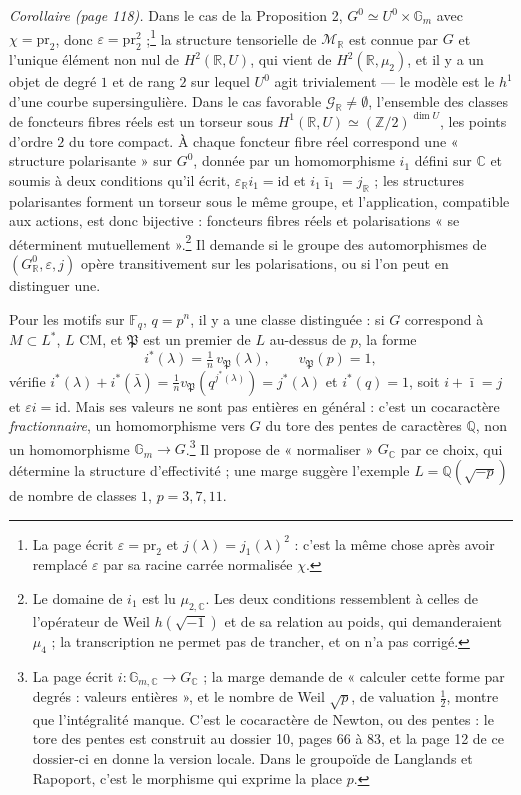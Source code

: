 \documentclass[11pt,a4paper]{article}
\begin{document}
\emph{Corollaire (page 118).} Dans le cas de la Proposition 2, $G^{0} \simeq
U^{0} \times \mathbb{G}_{m}$ avec $\chi = \mathrm{pr}_{2}$, donc $\varepsilon =
\mathrm{pr}_{2}^{2}$ ;\footnote{La page écrit $\varepsilon = \mathrm{pr}_{2}$ et
$j(\lambda) = j_{1}(\lambda)^{2}$ : c'est la même chose après avoir remplacé
$\varepsilon$ par sa racine carrée normalisée $\chi$.} la structure tensorielle de
$\mathcal{M}_{\mathbb{R}}$ est connue par $G$ et l'unique élément non nul de
$H^{2}(\mathbb{R}, U)$, qui vient de $H^{2}(\mathbb{R}, \mu_{2})$, et il y a un
objet de degré $1$ et de rang $2$ sur lequel $U^{0}$ agit trivialement --- le
modèle est le $h^{1}$ d'une courbe supersingulière. Dans le cas favorable
$\mathcal{G}_{\mathbb{R}} \neq \emptyset$, l'ensemble des classes de foncteurs
fibres réels est un torseur sous $H^{1}(\mathbb{R}, U) \simeq
(\mathbb{Z}/2)^{\dim U}$, les points d'ordre $2$ du tore compact. À chaque
foncteur fibre réel correspond une « structure polarisante » sur $G^{0}$, donnée
par un homomorphisme $i_{1}$ défini sur $\mathbb{C}$ et soumis à deux conditions
qu'il écrit, $\varepsilon_{\mathbb{R}} i_{1} = \mathrm{id}$ et $i_{1}\bar{\imath}_{1}
= j_{\mathbb{R}}$ ; les structures polarisantes forment un torseur sous le même
groupe, et l'application, compatible aux actions, est donc bijective : foncteurs
fibres réels et polarisations « se déterminent mutuellement ».\footnote{Le
domaine de $i_{1}$ est lu $\mu_{2,\mathbb{C}}$. Les deux conditions ressemblent
à celles de l'opérateur de Weil $h(\sqrt{-1})$ et de sa relation au poids, qui
demanderaient $\mu_{4}$ ; la transcription ne permet pas de trancher, et on
n'a pas corrigé.} Il demande si le groupe des automorphismes de
$(G^{0}_{\mathbb{R}}, \varepsilon, j)$ opère transitivement sur les polarisations,
ou si l'on peut en distinguer une.

Pour les motifs sur $\mathbb{F}_{q}$, $q = p^{n}$, il y a une classe distinguée :
si $G$ correspond à $M \subset L^{*}$, $L$ CM, et $\mathfrak{P}$ est un premier de
$L$ au-dessus de $p$, la forme
\[
  i^{*}(\lambda) = \tfrac{1}{n}\, v_{\mathfrak{P}}(\lambda) , \qquad
  v_{\mathfrak{P}}(p) = 1 ,
\]
vérifie $i^{*}(\lambda) + i^{*}(\bar{\lambda}) = \tfrac{1}{n}
v_{\mathfrak{P}}(q^{j^{*}(\lambda)}) = j^{*}(\lambda)$ et $i^{*}(q) = 1$, soit
$i + \bar{\imath} = j$ et $\varepsilon i = \mathrm{id}$. Mais ses valeurs ne sont
pas entières en général : c'est un cocaractère \emph{fractionnaire}, un
homomorphisme vers $G$ du tore des pentes de caractères $\mathbb{Q}$, non un
homomorphisme $\mathbb{G}_{m} \to G$.\footnote{La page écrit $i \colon
\mathbb{G}_{m,\mathbb{C}} \to G_{\mathbb{C}}$ ; la marge demande de « calculer
cette forme par degrés : valeurs entières », et le nombre de Weil $\sqrt{p}$,
de valuation $\tfrac{1}{2}$, montre que l'intégralité manque. C'est le
cocaractère de Newton, ou des pentes : le tore des pentes est construit au
dossier 10, pages 66 à 83, et la page 12 de ce dossier-ci en donne la version
locale. Dans le groupoïde de Langlands et Rapoport, c'est le morphisme qui
exprime la place $p$.} Il propose de « normaliser » $G_{\mathbb{C}}$ par ce
choix, qui détermine la structure d'effectivité ; une marge suggère l'exemple
$L = \mathbb{Q}(\sqrt{-p})$ de nombre de classes $1$, $p = 3, 7, 11$.
\end{document}
